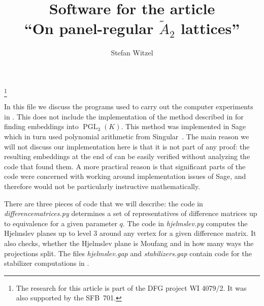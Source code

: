 \documentclass[a4paper,11pt]{amsart}
\numberwithin{equation}{section}
\theoremstyle{plain}
\theoremstyle{definition}
\theoremstyle{remark}
\newcommand{\PGL}{\operatorname{PGL}}
\numberwithin{equation}{section}
\begin{document}
\title[Software for the article ``On panel-regular $\tilde{A}_2$ lattices'']{Software for the article\\``On panel-regular $\tilde{A}_2$ lattices''}
\date{}


\author[S.~Witzel]{Stefan Witzel}
\address{Department of Mathematics, Bielefeld University, PO Box 100131, 33501 Bielefeld, Germany}
\thanks{The research for this article is part of the DFG project WI 4079/2. It was also supported by the SFB~701.}

\maketitle

In this file we discuss the programs used to carry out the computer experiments in \cite{witzel}. This does not include the implementation of the method described in \cite[Section~8]{witzel} for finding embeddings into $\PGL_3(K)$. This method was implemented in Sage~\cite{sage} which in turn used polynomial arithmetic from Singular~\cite{singular}. The main reason we will not discuss our implementation here is that it is not part of any proof: the resulting embeddings at the end of \cite[Section~8]{witzel} can be easily verified without analyzing the code that found them. A more practical reason is that significant parts of the code were concerned with working around implementation issues of Sage, and therefore would not be particularly instructive mathematically.

There are three pieces of code that we will describe: the code in \emph{difference\textunderscore matrices.py} determines a set of representatives of difference matrices up to equivalence for a given parameter $q$. The code in \emph{hjelmslev.py} computes the Hjelmslev planes up to level $3$ around any vertex for a given difference matrix. It also checks, whether the Hjelmslev plane is Moufang and in how many ways the projections split. The files \emph{hjelmslev.gap} and \emph{stabilizers.gap} contain code for the stabilizer computations in \cite[Section~10]{witzel}.
\end{document}
